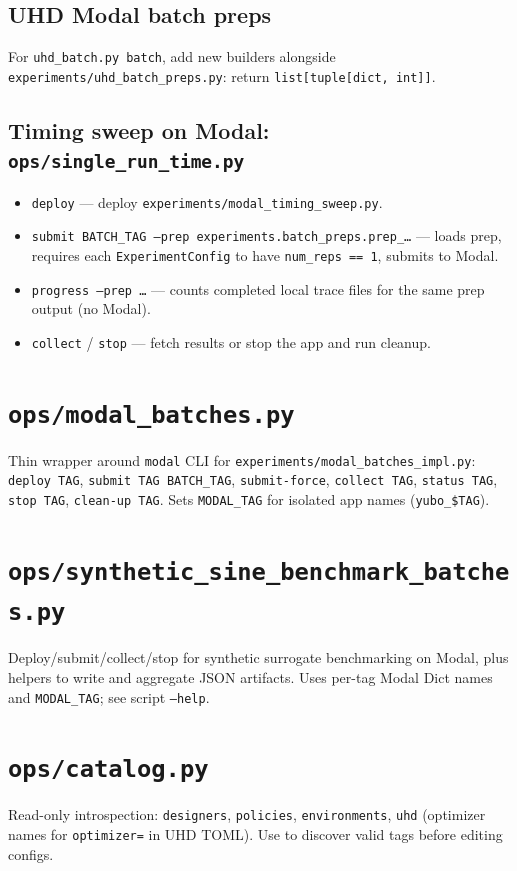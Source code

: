 \documentclass[11pt]{article}
\begin{document}
\subsection{UHD Modal batch preps}
For \texttt{uhd\_batch.py batch}, add new builders alongside \texttt{experiments/uhd\_batch\_preps.py}: return \texttt{list[tuple[dict, int]]}.

\subsection{Timing sweep on Modal: \texttt{ops/single\_run\_time.py}}
\begin{itemize}
  \item \texttt{deploy} --- deploy \texttt{experiments/modal\_timing\_sweep.py}.
  \item \texttt{submit BATCH\_TAG --prep experiments.batch\_preps.prep\_\dots} --- loads prep, requires each \texttt{ExperimentConfig} to have \texttt{num\_reps == 1}, submits to Modal.
  \item \texttt{progress --prep \dots} --- counts completed local trace files for the same prep output (no Modal).
  \item \texttt{collect} / \texttt{stop} --- fetch results or stop the app and run cleanup.
\end{itemize}

\section{\texttt{ops/modal\_batches.py}}
Thin wrapper around \texttt{modal} CLI for \texttt{experiments/modal\_batches\_impl.py}: \texttt{deploy TAG}, \texttt{submit TAG BATCH\_TAG}, \texttt{submit-force}, \texttt{collect TAG}, \texttt{status TAG}, \texttt{stop TAG}, \texttt{clean-up TAG}. Sets \texttt{MODAL\_TAG} for isolated app names (\texttt{yubo\_\$TAG}).

\section{\texttt{ops/synthetic\_sine\_benchmark\_batches.py}}
Deploy/submit/collect/stop for synthetic surrogate benchmarking on Modal, plus helpers to write and aggregate JSON artifacts. Uses per-tag Modal Dict names and \texttt{MODAL\_TAG}; see script \texttt{--help}.

\section{\texttt{ops/catalog.py}}
Read-only introspection: \texttt{designers}, \texttt{policies}, \texttt{environments}, \texttt{uhd} (optimizer names for \texttt{optimizer=} in UHD TOML). Use to discover valid tags before editing configs.
\end{document}
